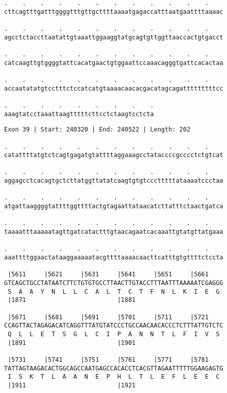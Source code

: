 \documentclass{article}
\begin{document}
\begin{Verbatim}
.    .    .    .    .    .    .    .    .    .    .    .    
cttcagtttgatttggggtttgttgcttttaaaatgagaccatttaatgaattttaaaac
  
.    .    .    .    .    .    .    .    .    .    .    .    
agcctctaccttaatattgtaaattggaaggtatgcagtgttggttaaccactgtgacct
  
.    .    .    .    .    .    .    .    .    .    .    .    
catcaagttgtggggtattcacatgaactgtggaattccaaacagggtgattcacactaa
  
.    .    .    .    .    .    .    .    .    .    .    .    
accaatatatgtcctttctccatcatgtaaaacaacacgacatagcagatttttttttcc
  
.    .    .    .    .    .    .    .    .
aaagtatcctaaattaagtttttcttcctctaagtcctcta
\end{Verbatim}
\newpage
\begin{Verbatim}
Exon 39 | Start: 240320 | End: 240522 | Length: 202
 
.    .    .    .    .    .    .    .    .    .    .    .    
catattttatgtctcagtgagatgtattttaggaaagcctataccccgcccctctgtcat
  
.    .    .    .    .    .    .    .    .    .    .    .    
aggagcctcacagtgctcttatggttatatcaagtgtgtccctttttataaaatccctaa
  
.    .    .    .    .    .    .    .    .    .    .    .    
atgattaaggggtattttggttttactgtagaattataacatcttatttctaactgatca
  
.    .    .    .    .    .    .    .    .    .    .    .    
taaaatttaaaaatagttgatcatactttgtaacagaatcacaaattgtatgttatgaaa
  
.    .    .    .    .    .    .    .    .    .    .    .    
aaattttggaactataaggaaaaatacgttttaaaacaacttcatttgtgttttctccta
  
 |5611     |5621     |5631     |5641     |5651     |5661    
GTCAGCTGCCTATAATCTTCTGTGTGCCTTAACTTGTACCTTTAATTTAAAAATCGAGGG
 S  A  A  Y  N  L  L  C  A  L  T  C  T  F  N  L  K  I  E  G 
 |1871                         |1881                        
  
 |5671     |5681     |5691     |5701     |5711     |5721    
CCAGTTACTAGAGACATCAGGTTTATGTATCCCTGCCAACAACACCCTCTTTATTGTCTC
 Q  L  L  E  T  S  G  L  C  I  P  A  N  N  T  L  F  I  V  S 
 |1891                         |1901                        
  
 |5731     |5741     |5751     |5761     |5771     |5781    
TATTAGTAAGACACTGGCAGCCAATGAGCCACACCTCACGTTAGAATTTTTGGAAGAGTG
 I  S  K  T  L  A  A  N  E  P  H  L  T  L  E  F  L  E  E  C 
 |1911                         |1921                        
  

\end{Verbatim}
\end{document}

